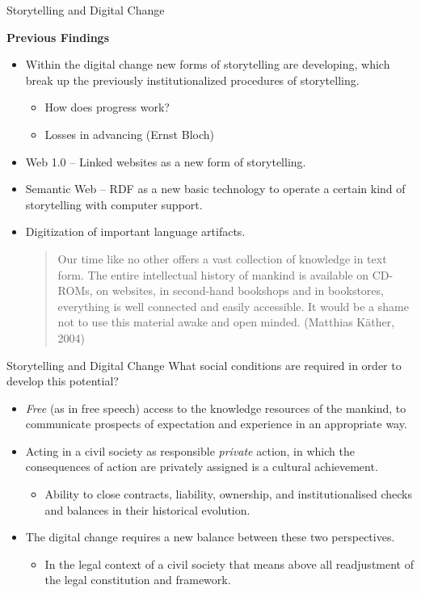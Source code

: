 \documentclass{beamer}
\newcommand{\ueberschrift}[1]{\begin{center}\bf #1\end{center}}
\begin{document}
\begin{frame}{Storytelling and Digital Change}
\ueberschrift{Previous Findings}
\begin{itemize}
\item Within the digital change new forms of storytelling are developing,
  which break up the previously institutionalized procedures of storytelling.
  \begin{itemize}
  \item How does progress work?
  \item Losses in advancing (Ernst Bloch)
  \end{itemize}
\item Web 1.0 -- Linked websites as a new form of storytelling.
\item Semantic Web -- RDF as a new basic technology to operate a certain kind
  of storytelling with computer support.
\item Digitization of important language artifacts.
  \begin{quote}\small
    Our time like no other offers a vast collection of knowledge in text form.
    The entire intellectual history of mankind is available on CD-ROMs, on
    websites, in second-hand bookshops and in bookstores, everything is well
    connected and easily accessible.  It would be a shame not to use this
    material awake and open minded. (Matthias Käther, 2004)
  \end{quote}
\end{itemize}\vspace*{2em}
\end{frame}

\begin{frame}{Storytelling and Digital Change}
What social conditions are required in order to develop this potential?
\begin{itemize}
\item \emph{Free} (as in free speech) access to the knowledge resources of the
  mankind, to communicate prospects of expectation and experience in an
  appropriate way.
\item Acting in a civil society as responsible \emph{private} action, in which
  the consequences of action are privately assigned is a cultural achievement.
  \begin{itemize}
  \item Ability to close contracts, liability, ownership, and
    institutionalised checks and balances in their historical evolution.
  \end{itemize}
\item The digital change requires a new balance between these two
  perspectives.
  \begin{itemize}
  \item In the legal context of a civil society that means above all
    readjustment of the legal constitution and framework.
  \end{itemize}
\end{itemize}
\end{frame}
\end{document}
